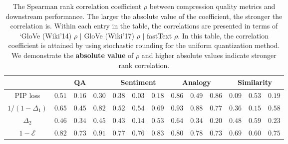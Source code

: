 \begin{table}
	\caption{The Spearman rank correlation coefficient $\rho$ between compression quality metrics and downstream performance. The larger the absolute value of the coefficient, the stronger the correlation is.
	Within each entry in the table, the correlations are presented in terms of `GloVe (Wiki'14) $\rho$ \; $|$ \; GloVe (Wiki'17) $\rho$ \; $|$ \; fastText $\rho$. In this table, the correlation coefficient is attained by using stochastic rounding for the uniform quantization method. We demonstrate the \textbf{absolute value} of $\rho$ and higher absolute values indicate stronger rank correlation.
	}
	\centering
	\small
	\begin{tabular}{c | c | c | c | c | c | c | c | c | c | c | c | c}
		\toprule
		& \multicolumn{3}{|c|}{QA} & \multicolumn{3}{|c|}{Sentiment} & \multicolumn{3}{|c|}{Analogy} & \multicolumn{3}{|c}{Similarity} \\
		\midrule
		PIP loss &  $0.51$&$0.16$&$0.30$  &  $0.38$&$0.03$&$0.18$  &  $0.86$&$0.49$&$0.86$  &  $0.09$&$0.53$&$0.19$  \\  
		$1/(1-\Delta_1)$ &  $0.65$&$0.45$&$0.82$  &  $0.52$&$0.54$&$0.69$  &  $0.93$&$0.88$&$0.77$  &  $0.36$&$0.15$&$0.58$  \\  
		$\Delta_2$ &  $0.46$&$0.34$&$0.45$  &  $0.43$&$0.14$&$0.53$  &  $0.64$&$0.34$&$0.20$  &  $0.48$&$0.59$&$0.23$  \\  
		$1 - \mathcal{E}$ & $\mathbf{0.82}$&$\mathbf{0.73}$&$\mathbf{0.91}$  &  $\mathbf{0.77}$&$\mathbf{0.76}$&$\mathbf{0.83}$  &  $0.80$&$0.78$&$0.73$  &  $\mathbf{0.69}$&$\mathbf{0.60}$&$\mathbf{0.75}$  \\  
		\bottomrule
	\end{tabular}
	\label{tab:sp_rank_stoc}
\end{table}

